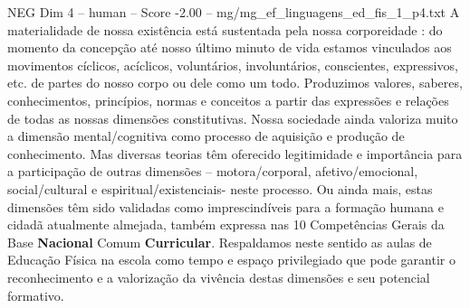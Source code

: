 \begin{textsample}{NEG Dim 4 – human – Score -2.00 – mg/mg\_ef\_linguagens\_ed\_fis\_1\_p4.txt}  \label{ex:f4_neg_012}
A materialidade de nossa existência está sustentada pela nossa corporeidade : do momento da concepção até nosso último minuto de vida estamos vinculados aos movimentos cíclicos, acíclicos, voluntários, involuntários, conscientes, expressivos, etc. de partes do nosso corpo ou dele como um todo.
Produzimos valores, saberes, conhecimentos, princípios, normas e conceitos a partir das expressões e relações de todas as nossas dimensões constitutivas.
Nossa sociedade ainda valoriza muito a dimensão mental/cognitiva como processo de aquisição e produção de conhecimento.
Mas diversas teorias têm oferecido legitimidade e importância para a participação de outras dimensões – motora/corporal, afetivo/emocional, social/cultural e espiritual/existenciais- neste processo.
Ou ainda mais, estas dimensões têm sido validadas como imprescindíveis para a formação humana e cidadã atualmente almejada, também expressa nas 10 Competências Gerais da Base \textbf{Nacional} Comum \textbf{Curricular}.
Respaldamos neste sentido as aulas de Educação Física na escola como tempo e espaço privilegiado que pode garantir o reconhecimento e a valorização da vivência destas dimensões e seu potencial formativo.

\end{textsample}
